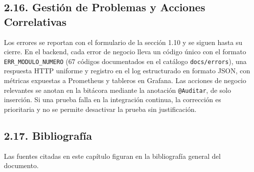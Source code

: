 \subsection{2.16. Gestión de Problemas y Acciones Correlativas}

Los errores se reportan con el formulario de la sección 1.10 y se siguen hasta su cierre. En el backend, cada error de negocio lleva un código único con el formato \texttt{ERR\_MODULO\_NUMERO} (67 códigos documentados en el catálogo \texttt{docs/errors}), una respuesta HTTP uniforme y registro en el log estructurado en formato JSON, con métricas expuestas a Prometheus y tableros en Grafana. Las acciones de negocio relevantes se anotan en la bitácora mediante la anotación \texttt{@Auditar}, de solo inserción. Si una prueba falla en la integración continua, la corrección es prioritaria y no se permite desactivar la prueba sin justificación.

\subsection{2.17. Bibliografía}

Las fuentes citadas en este capítulo figuran en la bibliografía general del documento.
